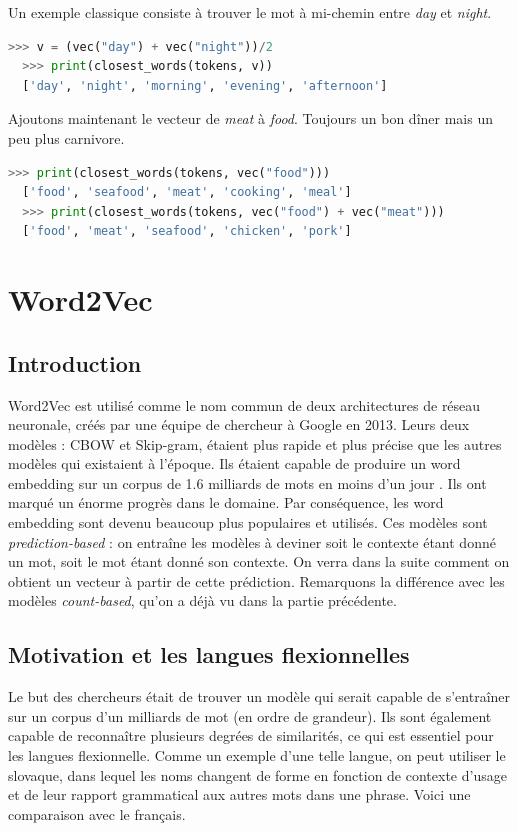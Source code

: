 \documentclass[11pt, a4paper]{report}
\begin{document}
Un exemple classique consiste à trouver le mot à mi-chemin entre \textit{day} et 
\textit{night}.
\begin{lstlisting}[language=Python]
  >>> v = (vec("day") + vec("night"))/2
  >>> print(closest_words(tokens, v))
  ['day', 'night', 'morning', 'evening', 'afternoon']
\end{lstlisting}  

Ajoutons maintenant le vecteur de \textit{meat} à \textit{food}.
Toujours un bon dîner mais un peu plus carnivore. 
\begin{lstlisting}[language=Python]
  >>> print(closest_words(tokens, vec("food")))
  ['food', 'seafood', 'meat', 'cooking', 'meal']
  >>> print(closest_words(tokens, vec("food") + vec("meat")))
  ['food', 'meat', 'seafood', 'chicken', 'pork']
\end{lstlisting}  

\section{Word2Vec}
\subsection{Introduction}
\cite{wikipedia-word2vec} \cite{wikipedia-word2vec-fr} Word2Vec est utilisé comme le nom commun de deux architectures de réseau neuronale, créés par 
une équipe de chercheur à Google en 2013. Leurs deux modèles : CBOW et Skip-gram, étaient plus 
rapide et plus précise que les autres modèles qui existaient à l'époque. Ils étaient capable 
de produire un word embedding sur un corpus de 1.6 milliards de mots en moins d'un jour \cite{word2vec-original}.
Ils ont marqué un énorme progrès dans le domaine. Par conséquence, les word embedding sont 
devenu beaucoup plus populaires et utilisés. Ces modèles sont \textit{prediction-based} : on 
entraîne les modèles à deviner soit le contexte étant donné un mot, soit le mot étant donné
son contexte. On verra dans la suite comment on obtient un vecteur à partir de cette prédiction.
Remarquons la différence avec les modèles \textit{count-based}, qu'on a déjà vu dans la partie 
précédente.

\subsection{Motivation et les langues flexionnelles}
\cite{word2vec-original} Le but des chercheurs était de trouver un modèle qui serait capable de s'entraîner sur un corpus 
d'un milliards de mot (en ordre de grandeur). Ils sont également capable de reconnaître 
plusieurs degrées de similarités, ce qui est essentiel pour les langues flexionnelle. 
Comme un exemple d'une telle langue, on peut utiliser le slovaque, dans lequel les noms 
changent de forme en fonction de contexte d'usage et de leur rapport grammatical aux autres 
mots dans une phrase. Voici une comparaison avec le français.
\end{document}
